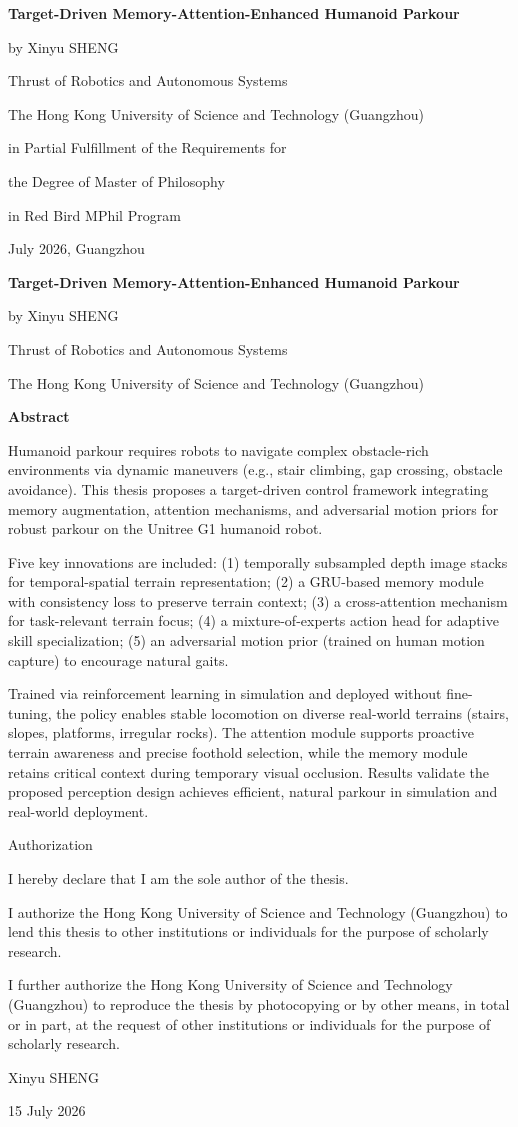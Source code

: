 \documentclass[12pt,oneside,openany]{book}
\newcommand{\ThesisTitleText}{Target-Driven Memory-Attention-Enhanced Humanoid Parkour}
\newcommand{\ThesisAuthorText}{Xinyu SHENG}
\newcommand{\ThesisProgramText}{Red Bird MPhil Program}
\newcommand{\ThesisThrustText}{Thrust of Robotics and Autonomous Systems}
\newcommand{\ThesisCompletionDateText}{July 2026}
\newcommand{\ThesisAbstractText}{
Humanoid parkour requires robots to navigate complex obstacle-rich environments via dynamic maneuvers (e.g., stair climbing, gap crossing, obstacle avoidance). This thesis proposes a target-driven control framework integrating memory augmentation, attention mechanisms, and adversarial motion priors for robust parkour on the Unitree G1 humanoid robot.

Five key innovations are included: (1) temporally subsampled depth image stacks for temporal-spatial terrain representation; (2) a GRU-based memory module with consistency loss to preserve terrain context; (3) a cross-attention mechanism for task-relevant terrain focus; (4) a mixture-of-experts action head for adaptive skill specialization; (5) an adversarial motion prior (trained on human motion capture) to encourage natural gaits.

Trained via reinforcement learning in simulation and deployed without fine-tuning, the policy enables stable locomotion on diverse real-world terrains (stairs, slopes, platforms, irregular rocks). The attention module supports proactive terrain awareness and precise foothold selection, while the memory module retains critical context during temporary visual occlusion. Results validate the proposed perception design achieves efficient, natural parkour in simulation and real-world deployment.
}
\begin{document}
\frontmatter

\clearpage
\thispagestyle{plain}
\vspace*{25mm}
\begin{center}
{\Large\bfseries \ThesisTitleText\par}
\vspace{1em}
by \ThesisAuthorText\par
\vspace{1em}
\ThesisThrustText\par
\vspace{1em}
The Hong Kong University of Science and Technology (Guangzhou)\par
\vspace{1em}
in Partial Fulfillment of the Requirements for\par
\vspace{0.5em}
the Degree of Master of Philosophy\par
\vspace{0.5em}
in \ThesisProgramText\par
\vspace{1em}
\ThesisCompletionDateText, Guangzhou\par
\end{center}

\clearpage
\thispagestyle{plain}
\vspace*{25mm}
\begin{center}
{\Large\bfseries \ThesisTitleText\par}
\vspace{1em}
by \ThesisAuthorText\par
\vspace{1em}
\ThesisThrustText\par
The Hong Kong University of Science and Technology (Guangzhou)\par
\vspace{2em}
{\Large\bfseries Abstract\par}
\end{center}
\vspace{1em}
\noindent\ThesisAbstractText\par

\clearpage
\thispagestyle{plain}
\vspace*{25mm}
Authorization\par
\vspace{1em}
I hereby declare that I am the sole author of the thesis.\par
I authorize the Hong Kong University of Science and Technology (Guangzhou) to lend this thesis to other institutions or individuals for the purpose of scholarly research.\par
I further authorize the Hong Kong University of Science and Technology (Guangzhou) to reproduce the thesis by photocopying or by other means, in total or in part, at the request of other institutions or individuals for the purpose of scholarly research.\par
\vfill
\noindent \ThesisAuthorText\par
\vspace{2\baselineskip}
15 July 2026\par
\end{document}
